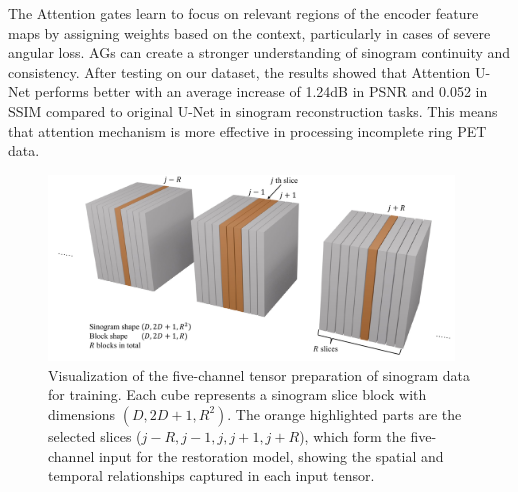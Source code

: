 \documentclass[12pt]{iopart}
\begin{document}
The Attention gates learn to focus on relevant regions of the encoder feature maps by assigning weights based on the context, particularly in cases of severe angular loss. AGs can create a stronger understanding of sinogram continuity and consistency.
After testing on our dataset, the results showed that Attention U-Net performs better with an average increase of 1.24dB in PSNR and 0.052 in SSIM compared to original U-Net in sinogram reconstruction tasks. This means that attention mechanism is more effective in processing incomplete ring PET data.



\begin{figure}[htbp]
\centering
\vspace{-.3cm}
\includegraphics[width=0.96\textwidth]{Images/slices.pdf}
\vspace{-.3cm}
\caption{Visualization of the five-channel tensor preparation of sinogram data for training. Each cube represents a sinogram slice block with dimensions $(D, 2D+1, R^2)$. The orange highlighted parts are the selected slices ($j-R, j-1, j, j+1, j+R$), which form the five-channel input for the restoration model, showing the spatial and temporal relationships captured in each input tensor.}
\label{fig:sinogram_structure}
\end{figure}
\end{document}
